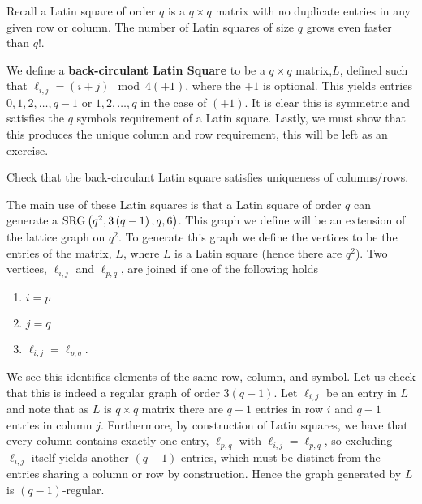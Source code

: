 \begin{recall}
	Recall a Latin square of order \(q\) is a \(q \times q\) matrix with no duplicate entries in any given row or column. The number of Latin squares of size \(q\) grows even faster than \(q!\).
\end{recall}
\begin{definition}
	We define a \textbf{back-circulant Latin Square} to be a \( q \times q\) matrix,\( L\), defined such that \(\ell_{i, j}= \left( i + j \right) \mod 4 \left( + 1 \right) \), where the \(+1\) is optional. This yields entries \(0, 1, 2, \ldots, q-1\) or \(1, 2, \ldots, q\) in the case of \(\left( +1 \right) \). It is clear this is symmetric and satisfies the \(q\) symbols requirement of a Latin square. Lastly, we must show that this produces the unique column and row requirement, this will be left as an exercise.
\end{definition}
\begin{problem}
	Check that the back-circulant Latin square satisfies uniqueness of columns/rows.
\end{problem}
The main use of these Latin squares is that a Latin square of order  \(q\) can generate a \(\operatorname{SRG}\left( q^2, 3\left( q-1 \right) , q, 6 \right)  \). This graph we define will be an extension of the lattice graph on \(q^2\). To generate this graph we define the vertices to be the entries of the matrix, \(L\), where  \(L\) is a Latin square (hence there are \(q^2\)). Two vertices, \(\ell_{i, j}\) and \(\ell_{p, q}\), are joined if one of the following holds
 \begin{enumerate}
	\item \(i=p\)
	\item \(j=q\)
	\item \(\ell_{i, j}= \ell_{p, q}\).
\end{enumerate}
We see this identifies elements of the same row, column, and symbol. Let us check that this is indeed a regular graph of order  \(3\left( q-1 \right) \). Let \(\ell_{i, j}\) be an entry in \(L\) and note that as  \(L\) is \(q \times q\) matrix there are \(q-1\) entries in row \(i\) and \(q-1\) entries in column \(j\). Furthermore, by construction of Latin squares, we have that every column contains exactly one entry, \(\ell_{p, q}\) with  \(\ell_{i, j} = \ell_{p, q}\), so excluding \(\ell_{i, j}\) itself yields another \(\left( q-1 \right) \) entries, which must be distinct from the entries sharing a column or row by construction. Hence the graph generated by \(L\) is  \(\left( q-1 \right) \)-regular.
